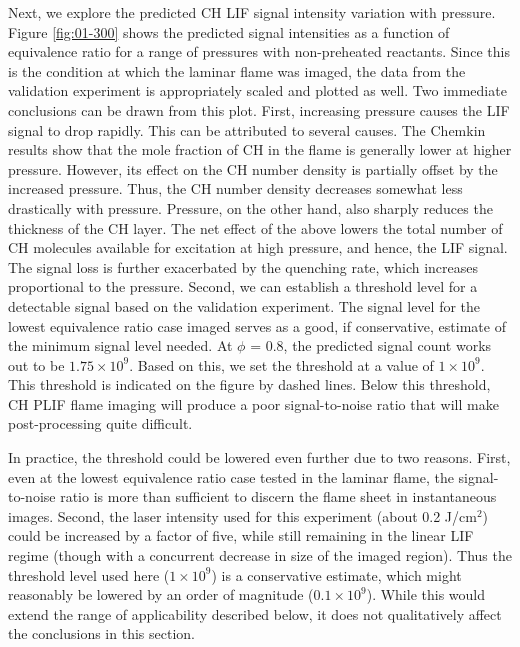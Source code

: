 Next, we explore the predicted CH LIF signal intensity variation with pressure.
Figure \ref{fig:01-300} shows the predicted signal intensities as a function of equivalence ratio for a range of pressures with non-preheated reactants.
Since this is the condition at which the laminar flame was imaged, the data from the validation experiment is appropriately scaled and plotted as well.
Two immediate conclusions can be drawn from this plot.
First, increasing pressure causes the LIF signal to drop rapidly.
This can be attributed to several causes.
The Chemkin results show that the mole fraction of CH in the flame is generally lower at higher pressure.
However, its effect on the CH number density is partially offset by the increased pressure.
Thus, the CH number density decreases somewhat less drastically with pressure.
Pressure, on the other hand, also sharply reduces the thickness of the CH layer.
The net effect of the above lowers the total number of CH molecules available for excitation at high pressure, and hence, the LIF signal.
The signal loss is further exacerbated by the quenching rate, which increases proportional to the pressure.
Second, we can establish a threshold level for a detectable signal based on the validation experiment.
The signal level for the lowest equivalence ratio case imaged serves as a good, if conservative, estimate of the minimum signal level needed.
At \(\phi\) = 0.8, the predicted signal count works out to be \(1.75\times10^9\).
Based on this, we set the threshold at a value of \(1\times10^9\).
This threshold is indicated on the figure by dashed lines.
Below this threshold, CH PLIF flame imaging will produce a poor signal-to-noise ratio that will make post-processing quite difficult.



In practice, the threshold could be lowered even further due to two reasons.
First, even at the lowest equivalence ratio case tested in the laminar flame, the signal-to-noise ratio is more than sufficient to discern the flame sheet in instantaneous images.
Second, the laser intensity used for this experiment (about 0.2 J/cm\(^2\)) could be increased by a factor of five, while still remaining in the linear LIF regime (though with a concurrent decrease in size of the imaged region).
Thus the threshold level used here (\(1\times10^9\)) is a conservative estimate, which might reasonably be lowered by an order of magnitude (\(0.1\times10^9\)). While this would extend the range of applicability described below, it does not qualitatively affect the conclusions in this section.

